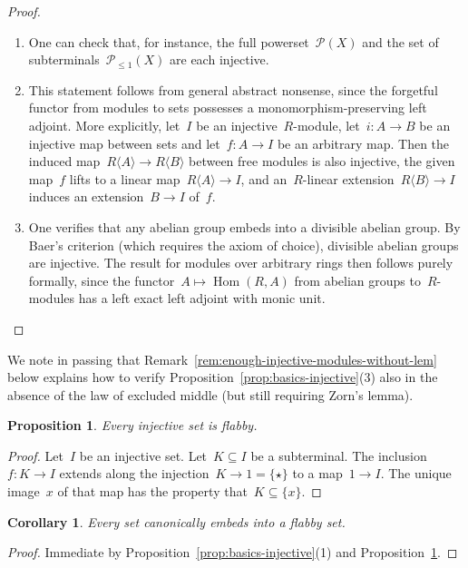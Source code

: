 \documentclass[oneside]{amsart}
\theoremstyle{definition}
\theoremstyle{plain}
\newtheorem{prop}[defn]{Proposition}
\newtheorem{cor}[defn]{Corollary}
\theoremstyle{remark}
\renewcommand{\P}{\mathcal{P}}
\DeclareMathOperator{\Hom}{Hom}
\renewcommand{\_}{\mathpunct{.}\,}
\begin{document}
\begin{proof}\begin{enumerate}
\item One can check that, for instance, the full powerset~$\P(X)$ and the set of
subterminals~$\P_{\leq 1}(X)$ are each injective.
\item This statement follows from general abstract nonsense, since the forgetful functor from modules to sets possesses a monomorphism-preserving left
adjoint. More explicitly, let~$I$ be an injective~$R$-module, let~$i : A \to B$ be an injective map between sets and
let~$f : A \to I$ be an arbitrary map. Then the induced map~$R\langle A \rangle
\to R\langle B \rangle$ between free modules is also injective, the given
map~$f$ lifts to a linear map~$R\langle A \rangle \to I$, and an~$R$-linear
extension~$R\langle B \rangle \to I$ induces an extension~$B \to I$ of~$f$.
\item One verifies that any abelian group embeds into a divisible
abelian group. By Baer's criterion (which requires the axiom of choice), divisible abelian groups are injective.
The result for modules over arbitrary rings then follows purely
formally, since the functor~$A \mapsto \Hom(R,A)$ from abelian groups
to~$R$-modules has a left exact left adjoint with monic unit. \qedhere
\end{enumerate}\end{proof}

We note in passing that Remark~\ref{rem:enough-injective-modules-without-lem}
below explains how to verify Proposition~\ref{prop:basics-injective}(3) also in
the absence of the law of excluded middle (but still requiring Zorn's lemma).

\begin{prop}\label{prop:injective-flabby}
Every injective set is flabby.\end{prop}

\begin{proof}Let~$I$ be an injective set. Let~$K \subseteq I$ be a subterminal.
The inclusion~$f : K \to I$ extends along the injection~$K \to 1 = \{\star\}$
to a map~$1 \to I$. The unique image~$x$ of that map has the property that~$K
\subseteq \{x\}$.\end{proof}

\begin{cor}\label{cor:enough-flabby-sets}
Every set canonically embeds into a flabby set.\end{cor}

\begin{proof}Immediate by Proposition~\ref{prop:basics-injective}(1) and
Proposition~\ref{prop:injective-flabby}.\end{proof}
\end{document}
